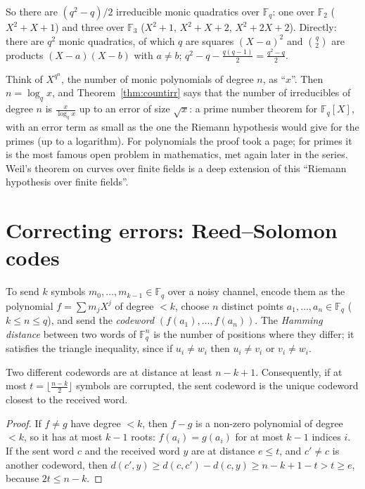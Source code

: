 So there are $(q^2-q)/2$ irreducible monic quadratics over $\mathbb F_q$: one over $\mathbb F_2$ ($X^2+X+1$) and three over $\mathbb F_3$ ($X^2+1$, $X^2+X+2$, $X^2+2X+2$). Directly: there are $q^2$ monic quadratics, of which $q$ are squares $(X-a)^2$ and $\binom q2$ are products $(X-a)(X-b)$ with $a\ne b$; $q^2-q-\frac{q(q-1)}2=\frac{q^2-q}2$.

\begin{remark}
Think of $X^{q^n}$, the number of monic polynomials of degree $n$, as ``$x$''. Then $n=\log_qx$, and Theorem~\ref{thm:countirr} says that the number of irreducibles of degree $n$ is $\frac x{\log_qx}$ up to an error of size $\sqrt x$: a prime number theorem for $\mathbb F_q[X]$, with an error term as small as the one the Riemann hypothesis would give for the primes (up to a logarithm). For polynomials the proof took a page; for primes it is the most famous open problem in mathematics, met again later in the series. Weil's theorem on curves over finite fields is a deep extension of this ``Riemann hypothesis over finite fields''.
\end{remark}

\section{Correcting errors: Reed--Solomon codes}

To send $k$ symbols $m_0,\dots,m_{k-1}\in\mathbb F_q$ over a noisy channel, encode them as the polynomial $f=\sum m_jX^j$ of degree $<k$, choose $n$ distinct points $a_1,\dots,a_n\in\mathbb F_q$ ($k\le n\le q$), and send the \emph{codeword} $(f(a_1),\dots,f(a_n))$. The \emph{Hamming distance} between two words of $\mathbb F_q^n$ is the number of positions where they differ; it satisfies the triangle inequality, since if $u_i\ne w_i$ then $u_i\ne v_i$ or $v_i\ne w_i$.

\begin{proposition}\label{prop:rsdist}
Two different codewords are at distance at least $n-k+1$. Consequently, if at most $t=\lfloor\frac{n-k}2\rfloor$ symbols are corrupted, the sent codeword is the unique codeword closest to the received word.
\end{proposition}
\begin{proof}
If $f\ne g$ have degree $<k$, then $f-g$ is a non-zero polynomial of degree $<k$, so it has at most $k-1$ roots: $f(a_i)=g(a_i)$ for at most $k-1$ indices $i$. If the sent word $c$ and the received word $y$ are at distance $e\le t$, and $c'\ne c$ is another codeword, then $d(c',y)\ge d(c,c')-d(c,y)\ge n-k+1-t>t\ge e$, because $2t\le n-k$.
\end{proof}

